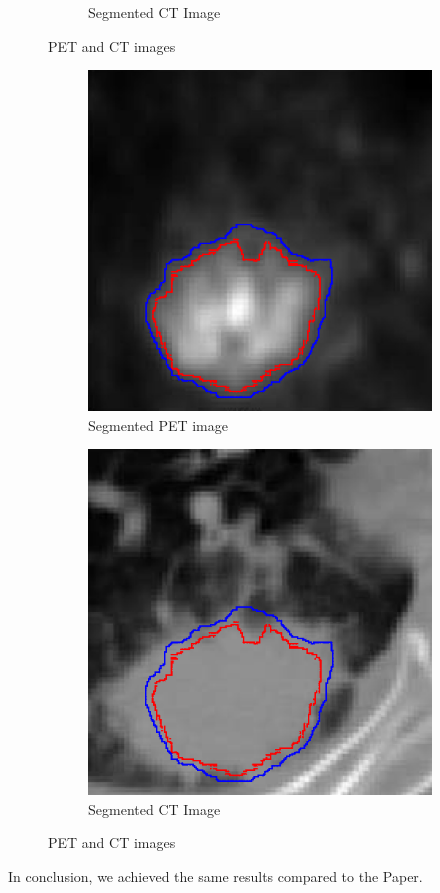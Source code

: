 \begin{figure}[h]
\begin{subfigure}{.5\textwidth}
		\caption{Segmented CT Image}
		\label{fig:sub2}
	\end{subfigure}
	\caption{PET and CT images}
	\label{fig:seg1}
\end{figure}

\begin{figure}[h]
	\centering
	\begin{subfigure}{.5\textwidth}
		\centering
		\includegraphics[width=.8\linewidth]{fig/pet2_marked}
		\caption{Segmented PET image}
		\label{fig:sub1}
	\end{subfigure}%
	\begin{subfigure}{.5\textwidth}
		\centering
		\includegraphics[width=.8\linewidth]{fig/ct2_marked}
		\caption{Segmented CT Image}
		\label{fig:sub2}
	\end{subfigure}
	\caption{PET and CT images}
	\label{fig:seg2}
\end{figure}

 In conclusion, we achieved the same results compared to the Paper.